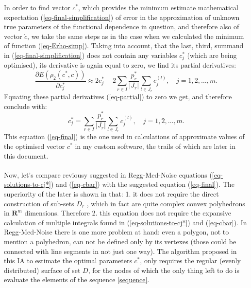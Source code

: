 In order to find vector $c^{*}$, which provides the minimum estimate mathematical expectation (\ref{eq-final-simplification}) of error in the approximation of unknown true parameters of the functional dependence in question, and therefore also of vector $\dot{c}$, we take the same steps as in the case when we calculated the minimum of function (\ref{eq-Erho-simp}). Taking into account, that the last, third, summand in (\ref{eq-final-simplification}) does not contain 
any variables $c_{j}^{*}$ (which are being optimised), its derivative is again equal to zero, we find its partial derivatives:
\begin{equation}
\frac{\partial E (\rho_{2}(c^{*},c))}{\partial c_{j}^{*}} \approx 2c_{j}^{*} - 2 \sum\limits_{r \in I} \frac{p_{r}^{*}}{\left| J_{r} \right|} \sum\limits_{l \in J_{r}} c_{j}^{(l)}, \quad j=1,2,\dots,m. \label{eq-partial}
\end{equation}
Equating these partial derivatives (\ref{eq-partial}) to zero we get, and therefore conclude with:
\begin{equation}
c_{j}^{*} = \sum\limits_{r \in I} \frac{p_{r}^{*}}{\left| J_{r} \right|} \sum\limits_{l \in J_{r}} c_{j}^{(l)}, \quad j=1,2,\dots,m. \label{eq-final}
\end{equation}
This equation (\ref{eq-final}) is the one used in calculations of approximate values of the optimised vector $c^{*}$ in my custom software, the trails of which are later in this document.\\
\\
Now, let's compare reviousy suggested in Regg-Med-Noise equations (\ref{eq-solutions-to-cj*}) and (\ref{eq-cbar}) with the suggested equation (\ref{eq-final}). The superiority of the later is shown in that: 1. it does not require the direct construction of sub-sets $D_{r}$
, which in fact are quite complex convex polyhedrons in $\boldsymbol{R}^{m}$ dimensions. Therefore 2. this equation does not require the expansive calculation of multiple integrals found in (\ref{eq-solutions-to-cj*}) and (\ref{eq-cbar}).  In Regg-Med-Noise there is one more problem at hand: even a polygon, not to mention a polyhedron, can not be defined only by its vertexes (those could be connected with line segments in not just one way). The algorithm proposed in this IA to estimate the optimal parameters $c^{*}$, only requires the regular (evenly distributed) surface of set $D$, for the nodes of which the only thing left to do is evaluate the elements of the sequence  \ref{sequence}.

